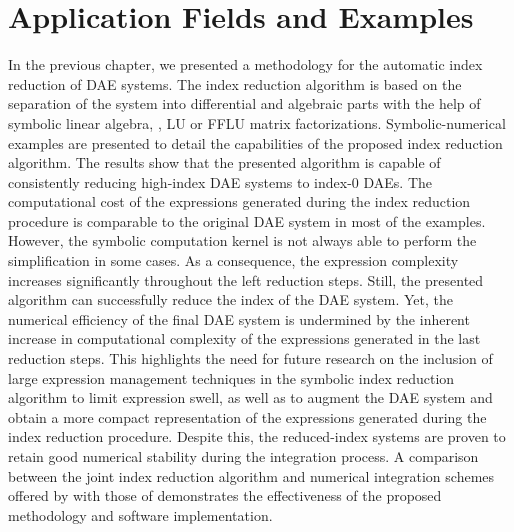 
\chapter{Application Fields and Examples}
\label{chap4:sec:applications}

In the previous chapter, we presented a methodology for the automatic index reduction of \ac{DAE} systems. The index reduction algorithm is based on the separation of the system into differential and algebraic parts with the help of symbolic linear algebra, \ie{}, \ac{LU} or \ac{FFLU} matrix factorizations. Symbolic-numerical examples are presented to detail the capabilities of the proposed index reduction algorithm. The results show that the presented algorithm is capable of consistently reducing high-index \ac{DAE} systems to index-0 \acp{DAE}. The computational cost of the expressions generated during the index reduction procedure is comparable to the original \ac{DAE} system in most of the examples. However, the \Maple{} symbolic computation kernel is not always able to perform the simplification in some cases. As a consequence, the expression complexity increases significantly throughout the left reduction steps. Still, the presented algorithm can successfully reduce the index of the \ac{DAE} system. Yet, the numerical efficiency of the final \ac{DAE} system is undermined by the inherent increase in computational complexity of the expressions generated in the last reduction steps. This highlights the need for future research on the inclusion of large expression management techniques in the symbolic index reduction algorithm to limit expression swell, as well as to augment the \ac{DAE} system and obtain a more compact representation of the expressions generated during the index reduction procedure. Despite this, the reduced-index systems are proven to retain good numerical stability during the integration process. A comparison between the joint index reduction algorithm and numerical integration schemes offered by \Maple{} with those of \Indigo{} demonstrates the effectiveness of the proposed methodology and software implementation.

